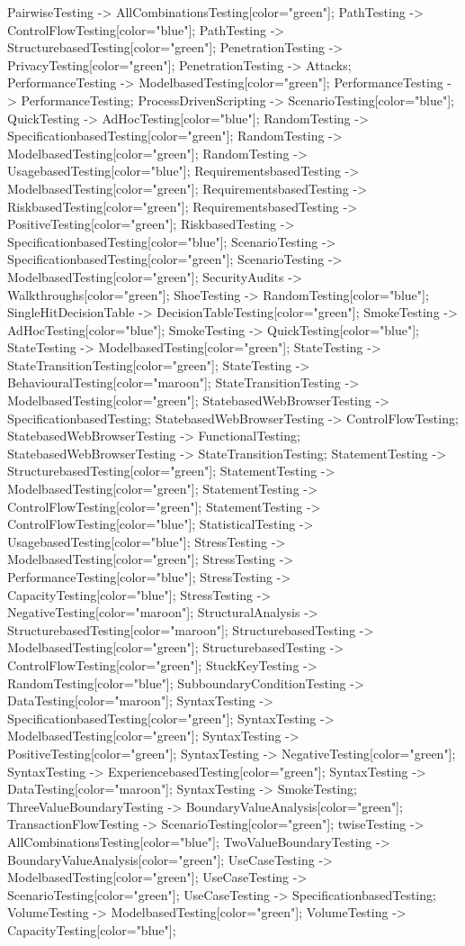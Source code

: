 \documentclass{article}
\begin{document}
{PairwiseTesting -> AllCombinationsTesting[color="green"];
PathTesting -> ControlFlowTesting[color="blue"];
PathTesting -> StructurebasedTesting[color="green"];
PenetrationTesting -> PrivacyTesting[color="green"];
PenetrationTesting -> Attacks;
PerformanceTesting -> ModelbasedTesting[color="green"];
PerformanceTesting -> PerformanceTesting;
ProcessDrivenScripting -> ScenarioTesting[color="blue"];
QuickTesting -> AdHocTesting[color="blue"];
RandomTesting -> SpecificationbasedTesting[color="green"];
RandomTesting -> ModelbasedTesting[color="green"];
RandomTesting -> UsagebasedTesting[color="blue"];
RequirementsbasedTesting -> ModelbasedTesting[color="green"];
RequirementsbasedTesting -> RiskbasedTesting[color="green"];
RequirementsbasedTesting -> PositiveTesting[color="green"];
RiskbasedTesting -> SpecificationbasedTesting[color="blue"];
ScenarioTesting -> SpecificationbasedTesting[color="green"];
ScenarioTesting -> ModelbasedTesting[color="green"];
SecurityAudits -> Walkthroughs[color="green"];
ShoeTesting -> RandomTesting[color="blue"];
SingleHitDecisionTable -> DecisionTableTesting[color="green"];
SmokeTesting -> AdHocTesting[color="blue"];
SmokeTesting -> QuickTesting[color="blue"];
StateTesting -> ModelbasedTesting[color="green"];
StateTesting -> StateTransitionTesting[color="green"];
StateTesting -> BehaviouralTesting[color="maroon"];
StateTransitionTesting -> ModelbasedTesting[color="green"];
StatebasedWebBrowserTesting -> SpecificationbasedTesting;
StatebasedWebBrowserTesting -> ControlFlowTesting;
StatebasedWebBrowserTesting -> FunctionalTesting;
StatebasedWebBrowserTesting -> StateTransitionTesting;
StatementTesting -> StructurebasedTesting[color="green"];
StatementTesting -> ModelbasedTesting[color="green"];
StatementTesting -> ControlFlowTesting[color="green"];
StatementTesting -> ControlFlowTesting[color="blue"];
StatisticalTesting -> UsagebasedTesting[color="blue"];
StressTesting -> ModelbasedTesting[color="green"];
StressTesting -> PerformanceTesting[color="blue"];
StressTesting -> CapacityTesting[color="blue"];
StressTesting -> NegativeTesting[color="maroon"];
StructuralAnalysis -> StructurebasedTesting[color="maroon"];
StructurebasedTesting -> ModelbasedTesting[color="green"];
StructurebasedTesting -> ControlFlowTesting[color="green"];
StuckKeyTesting -> RandomTesting[color="blue"];
SubboundaryConditionTesting -> DataTesting[color="maroon"];
SyntaxTesting -> SpecificationbasedTesting[color="green"];
SyntaxTesting -> ModelbasedTesting[color="green"];
SyntaxTesting -> PositiveTesting[color="green"];
SyntaxTesting -> NegativeTesting[color="green"];
SyntaxTesting -> ExperiencebasedTesting[color="green"];
SyntaxTesting -> DataTesting[color="maroon"];
SyntaxTesting -> SmokeTesting;
ThreeValueBoundaryTesting -> BoundaryValueAnalysis[color="green"];
TransactionFlowTesting -> ScenarioTesting[color="green"];
twiseTesting -> AllCombinationsTesting[color="blue"];
TwoValueBoundaryTesting -> BoundaryValueAnalysis[color="green"];
UseCaseTesting -> ModelbasedTesting[color="green"];
UseCaseTesting -> ScenarioTesting[color="green"];
UseCaseTesting -> SpecificationbasedTesting;
VolumeTesting -> ModelbasedTesting[color="green"];
VolumeTesting -> CapacityTesting[color="blue"];

}
\end{document}
